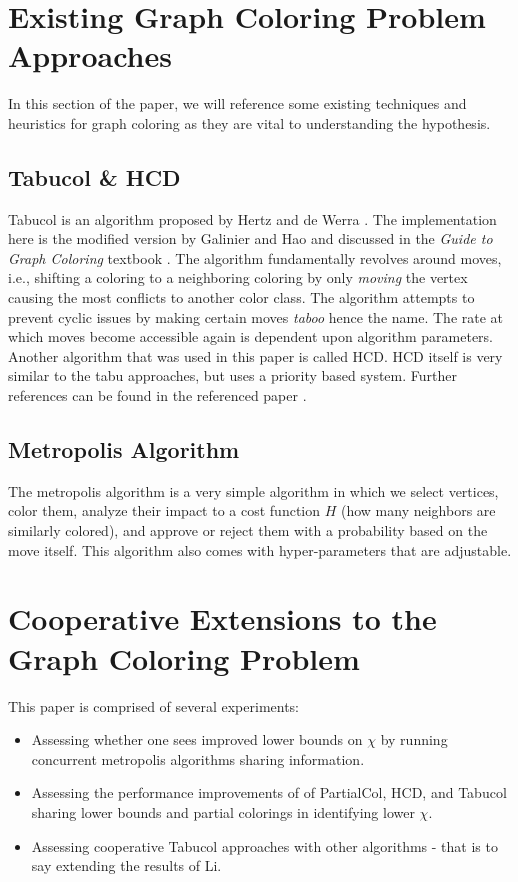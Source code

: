 \documentclass[runningheads]{llncs}
\begin{document}
\section{Existing Graph Coloring Problem Approaches }

In this section of the paper, we will reference some existing techniques and heuristics for graph coloring as they are vital to understanding the hypothesis.

\subsection{Tabucol \& HCD}\label{AA}
Tabucol is an algorithm proposed by Hertz and de Werra \cite{hdw}. The implementation here is the modified version by Galinier and Hao \cite{tabucol} and discussed in the \emph{Guide to Graph Coloring} textbook \cite{10.5555/2851123}. The algorithm fundamentally revolves around moves, i.e., shifting a coloring to a neighboring coloring by only \emph{moving} the vertex causing the most conflicts to another color class. The algorithm attempts to prevent cyclic issues by making certain moves \emph{taboo} hence the name. The rate at which moves become accessible again is dependent upon algorithm parameters. Another algorithm that was used in this paper is called HCD. HCD itself is very similar to the tabu approaches, but uses a priority based system. Further references can be found in the referenced paper \cite{10.1007/3-540-48318-7_25}.


\subsection{Metropolis Algorithm}
The metropolis algorithm is a very simple algorithm in which we select vertices, color them, analyze their impact to a cost function $H$ (how many neighbors are similarly colored), and approve or reject them with a probability based on the move itself. This algorithm also comes with hyper-parameters that are adjustable.


\section{Cooperative Extensions to the Graph Coloring Problem}

This paper is comprised of several experiments:

\begin{itemize}

  \item Assessing whether one sees improved lower bounds on $\chi$ by running concurrent metropolis algorithms sharing information.
  \item Assessing the performance improvements of of PartialCol, HCD, and Tabucol sharing lower bounds and partial colorings in identifying lower $\chi$.
    \item Assessing cooperative Tabucol approaches with other algorithms - that is to say extending the results of Li. \cite{https://doi.org/10.5445/ir/1000083192}
\end{itemize}
\end{document}
